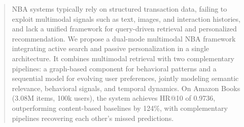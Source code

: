 \begin{abstract}
NBA systems typically rely on structured transaction data, failing to exploit multimodal signals such as text, images, and interaction histories, and lack a unified framework for query-driven retrieval and personalized recommendation. We propose a dual-mode multimodal NBA framework integrating active search and passive personalization in a single architecture. It combines multimodal retrieval with two complementary pipelines: a graph-based component for behavioral patterns and a sequential model for evolving user preferences, jointly modeling semantic relevance, behavioral signals, and temporal dynamics.
On Amazon Books~\cite{hou2024amazon} (3.08M items, 100k users), the system achieves HR@10 of 0.9736, outperforming content-based baselines by 124\%, with complementary pipelines recovering each other’s missed predictions.
\end{abstract}

